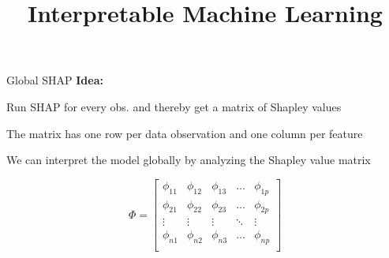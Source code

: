 \documentclass[10pt,compress,t,notes=noshow, xcolor=table]{beamer}
\title{Interpretable Machine Learning}
\begin{document}


\begin{framev}[align=top]{Global SHAP }
\textbf{Idea:}
\begin{itemizeM}
\item Run SHAP for every obs. and thereby get a matrix of Shapley values
\item The matrix has one row per data observation and one column per feature
\item We can interpret the model globally by analyzing the Shapley value matrix
\end{itemizeM}
\spacer[4.7]
$$
\Phi =
\begin{bmatrix}
\phi_{11} & \phi_{12} & \phi_{13} & \dots & \phi_{1p} \\
\phi_{21} & \phi_{22} & \phi_{23} & \dots & \phi_{2p} \\
\vdots & \vdots & \vdots & \ddots & \vdots \\
\phi_{n1} & \phi_{n2} & \phi_{n3} & \dots & \phi_{np} \\
\end{bmatrix}
$$
\end{framev}
\end{document}
